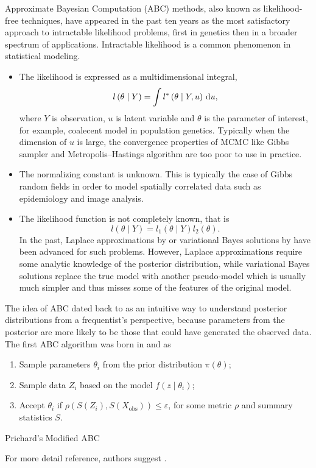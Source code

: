 Approximate Bayesian Computation (ABC) methods, also known as likelihood-free
techniques, have appeared in the past ten years as the most satisfactory
approach to intractable likelihood problems, first in genetics then
in a broader spectrum of applications. Intractable likelihood is a
common phenomenon in statistical modeling. 
\begin{itemize}
\item The likelihood is expressed as a multidimensional integral, 
\[
l\left(\theta\mid Y\right)=\int l^{*}\left(\theta\mid Y,u\right)\,\mathrm{d} u,
\]
where $Y$ is observation, $u$ is latent variable and $\theta$ is
the parameter of interest, for example, coalecent model in population
genetics. Typically when the dimension of $u$ is large, the convergence
properties of MCMC like Gibbs sampler and Metropolis--Hastings algorithm
are too poor to use in practice. 
\item The normalizing constant is unknown. This is typically the case of
Gibbs random fields in order to model spatially correlated data such
as epidemiology and image analysis. 
\item The likelihood function is not completely known, that is 
\[
l\left(\theta\mid Y\right)=l_{1}\left(\theta\mid Y\right)l_{2}\left(\theta\right).
\]
In the past, Laplace approximations by \citet{tierney1986accurate}
or variational Bayes solutions by \citet{jaakkola2000bayesian} have
been advanced for such problems. However, Laplace approximations require
some analytic knowledge of the posterior distribution, while variational
Bayes solutions replace the true model with another pseudo-model which
is usually much simpler and thus misses some of the features of the
original model.
\end{itemize}
\begin{comment}
abc machine learning
\end{comment}


The idea of ABC dated back to \citet{rubin1984bayesianly} as an intuitive
way to understand posterior distributions from a frequentist's perspective,
because parameters from the posterior are more likely to be those
that could have generated the observed data. The first ABC algorithm
was born in \citet{tavare1997inferring} and  \citet{pritchard1999population}
as 
\begin{algorithm}[h]
\begin{enumerate}
\item Sample parameters $\theta_{i}$ from the prior distribution $\pi\left(\theta\right)$;
\item Sample data $Z_{i}$ based on the model $f\left(z\mid\theta_{i}\right)$;
\item Accept $\theta_{i}$ if $\rho\left(S\left(Z_{i}\right),S\left(X_{\mathrm{obs}}\right)\right)\le\varepsilon$, {{}
} {for some metric $\rho$ and summary statistics
$S$. }
\end{enumerate}
\protect\caption{\label{alg:Prichard-ABC}Prichard's Modified ABC}
\end{algorithm}
For more detail reference, authors suggest \citet{marin2012approximate}.


